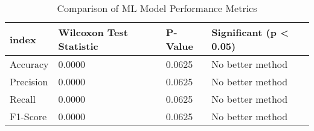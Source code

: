 \begin{table}[htbp]
\caption{Comparison of ML Model Performance Metrics}
\label{tab:model_comparison}
\begin{tabular}{llll}
\toprule
index & Wilcoxon Test Statistic & P-Value & Significant (p < 0.05) \\
\midrule
Accuracy & 0.0000 & 0.0625 & No better method \\
Precision & 0.0000 & 0.0625 & No better method \\
Recall & 0.0000 & 0.0625 & No better method \\
F1-Score & 0.0000 & 0.0625 & No better method \\
\bottomrule
\end{tabular}
\end{table}

